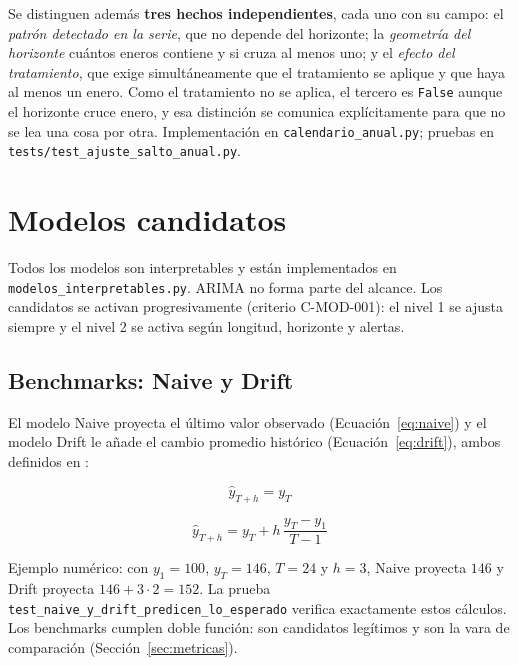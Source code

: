 \documentclass[12pt]{article}
\begin{document}
Se distinguen adem\'as \textbf{tres hechos independientes}, cada uno con su campo: el \emph{patr\'on detectado en la serie}, que no depende del horizonte; la \emph{geometr\'ia del horizonte} \textemdash{}cu\'antos eneros contiene y si cruza al menos uno\textemdash{}; y el \emph{efecto del tratamiento}, que exige simult\'aneamente que el tratamiento se aplique y que haya al menos un enero. Como el tratamiento no se aplica, el tercero es \texttt{False} aunque el horizonte cruce enero, y esa distinci\'on se comunica expl\'icitamente para que no se lea una cosa por otra. Implementaci\'on en \texttt{calendario\_anual.py}; pruebas en \texttt{tests/test\_ajuste\_salto\_anual.py}.

\section{Modelos candidatos}
\label{sec:modelos}

Todos los modelos son interpretables y est\'an implementados en \texttt{modelos\_interpretables.py}. ARIMA no forma parte del alcance. Los candidatos se activan progresivamente (criterio C-MOD-001): el nivel 1 se ajusta siempre y el nivel 2 se activa seg\'un longitud, horizonte y alertas.

\subsection{Benchmarks: Naive y Drift}

El modelo Naive proyecta el \'ultimo valor observado (Ecuaci\'on~\ref{eq:naive}) y el modelo Drift le a\~nade el cambio promedio hist\'orico (Ecuaci\'on~\ref{eq:drift}), ambos definidos en \citep{hyndman2021fpp3}:

\begin{equation}
\hat{y}_{T+h} = y_T
\label{eq:naive}
\end{equation}

\begin{equation}
\hat{y}_{T+h} = y_T + h\,\frac{y_T - y_1}{T-1}
\label{eq:drift}
\end{equation}

Ejemplo num\'erico: con $y_1=100$, $y_T=146$, $T=24$ y $h=3$, Naive proyecta $146$ y Drift proyecta $146 + 3\cdot 2 = 152$. La prueba \texttt{test\_naive\_y\_drift\_predicen\_lo\_esperado} verifica exactamente estos c\'alculos. Los benchmarks cumplen doble funci\'on: son candidatos leg\'itimos y son la vara de comparaci\'on (Secci\'on~\ref{sec:metricas}).
\end{document}
